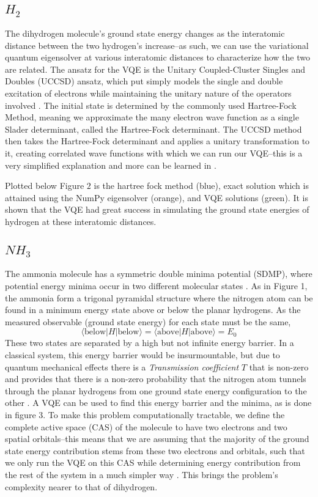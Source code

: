 \documentclass[10pt,twocolumn,letterpaper]{article}
\begin{document}
\subsection{$H_2$}
The dihydrogen molecule's ground state energy changes as the interatomic distance between the two hydrogen's increase\cite{vqe_vid}--as such, we can use the variational quantum eigensolver at various interatomic distances to characterize how the two are related. The ansatz for the VQE is the Unitary Coupled-Cluster Singles and Doubles (UCCSD) ansatz, which put simply models the single and double excitation of electrons while maintaining the unitary nature of the operators involved \cite{qiskit_nature}. The initial state is determined by the commonly used Hartree-Fock Method, meaning we approximate the many electron wave function as a single Slader determinant, called the Hartree-Fock determinant. The UCCSD method then takes the Hartree-Fock determinant and applies a unitary transformation to it, creating correlated wave functions with which we can run our VQE--this is a very simplified explanation and more can be learned in \cite{qiskit_nature}.

Plotted below Figure $2$ is the hartree fock method (blue), exact solution which is attained using the NumPy eigensolver (orange), and VQE solutions (green). It is shown that the VQE had great success in simulating the ground state energies of hydrogen at these interatomic distances. 
\subsection{$NH_3$}
The ammonia molecule has a symmetric double minima potential (SDMP), where potential energy minima occur in two different molecular states \cite{nh3}. As in Figure 1, the ammonia form a trigonal pyramidal structure where the nitrogen atom can be found in a minimum energy state above or below the planar hydrogens. As the measured observable (ground state energy) for each state must be the same, $$\langle \text{below} | H | \text{below} \rangle = \langle \text{above} | H | \text{above} \rangle = E_0$$
These two states are separated by a high but not infinite energy barrier. In a classical system, this energy barrier would be insurmountable, but due to quantum mechanical effects there is a \textit{Transmission coefficient} $T$ that is non-zero and provides that there is a non-zero probability that the nitrogen atom tunnels through the planar hydrogens from one ground state energy configuration to the other \cite{townsend}. A VQE can be used to find this energy barrier and the minima, as is done in figure 3. To make this problem computationally tractable, we define the complete active space (CAS) of the molecule to have two electrons and two spatial orbitals--this means that we are assuming that the majority of the ground state energy contribution stems from these two electrons and orbitals, such that we only run the VQE on this CAS while determining energy contribution from the rest of the system in a much simpler way \cite{vqe}. This brings the problem's complexity nearer to that of dihydrogen.
\end{document}
